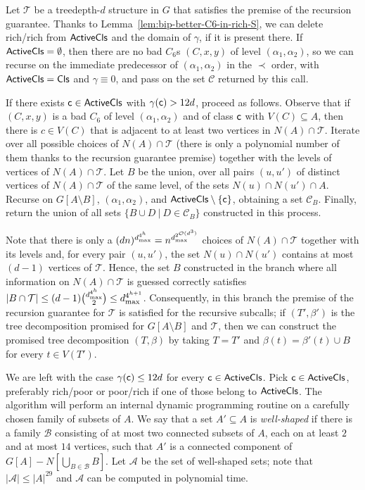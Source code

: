 \documentclass[11pt,a4paper]{article}
\theoremstyle{definition}
\newcommand{\Oh}{\mathcal{O}}
\def\T{\mathcal{T}}
\begin{document}
Let $\T$ be a treedepth-$d$ structure in $G$ that satisfies the premise of the recursion guarantee.
Thanks to Lemma~\ref{lem:bip-better-C6-in-rich-S}, we can delete rich/rich from $\mathsf{ActiveCls}$ and the domain of $\gamma$, if it is present there.
If $\mathsf{ActiveCls} = \emptyset$, then there are no bad $C_6$s $(C,x,y)$ of level $(\alpha_1,\alpha_2)$,
so we can recurse on the immediate predecessor
of $(\alpha_1,\alpha_2)$ in the $\prec$ order, with $\mathsf{ActiveCls} = \mathsf{Cls}$
and $\gamma \equiv 0$, and pass on the set $\mathcal{C}$ returned by this call. 

If there exists $\mathsf{c} \in \mathsf{ActiveCls}$ with $\gamma(\mathsf{c}) > 12d$, proceed
as follows. 
Observe that if $(C,x,y)$ is a bad $C_6$ of level $(\alpha_1,\alpha_2)$ and of class $\mathsf{c}$
with $V(C) \subseteq A$, then there is $c \in V(C)$ that is adjacent to at least two
vertices in $N(A) \cap \T$.
Iterate over all possible choices of $N(A) \cap \T$ (there is only a polynomial number
of them thanks to the recursion guarantee premise) together with the levels of vertices
of $N(A) \cap \T$. Let $B$ be the union, over all pairs $(u,u')$ of distinct vertices
of $N(A) \cap \T$ of the same level, of the sets $N(u) \cap N(u') \cap A$. 
Recurse on $G[A \setminus B]$, $(\alpha_1,\alpha_2)$, and $\mathsf{ActiveCls} \setminus \{\mathsf{c}\}$,
obtaining a set $\mathcal{C}_B$. 
Finally, return the union of all sets $\{B \cup D~|~D \in \mathcal{C}_B\}$ 
constructed in this process.

Note that there is only a $(dn)^{\bigbound^{4^h}} = n^{\bigbound^{2^{\Oh(d^3)}}}$
choices of $N(A) \cap \T$ together with its levels and, for every pair $(u,u')$, 
the set $N(u) \cap N(u')$ contains at most $(d-1)$ vertices of $\T$. 
Hence, the set $B$ constructed in the branch where all information
on $N(A) \cap \T$ is guessed correctly satisfies $|B \cap \T| \leq (d-1) \binom{\bigbound^{4^h}}{2} \leq \bigbound^{4^{h+1}}$.
Consequently, in this branch the premise of the recursion guarantee for $\T$ is satisfied
for the recursive subcalls; if $(T',\beta')$ is the tree decomposition
promised for $G[A \setminus B]$ and $\T$, then 
we can construct the promised tree decomposition $(T,\beta)$ by taking $T = T'$
and $\beta(t) = \beta'(t) \cup B$ for every $t \in V(T')$. 

We are left with the case $\gamma(\mathsf{c}) \leq 12d$ for every $\mathsf{c} \in \mathsf{ActiveCls}$.
Pick $\mathsf{c} \in \mathsf{ActiveCls}$, preferably rich/poor or poor/rich
if one of those belong to $\mathsf{ActiveCls}$.
The algorithm will perform an internal dynamic programming routine on a carefully
chosen family of subsets of $A$. 
We say that a set $A' \subseteq A$ is \emph{well-shaped} if there is a family 
$\mathcal{B}$ consisting of at most two connected subsets of $A$, each on at least $2$
and at most $14$
vertices, such that $A'$ is a connected component of $G[A]-N[\bigcup_{B \in \mathcal{B}} B]$. 
Let $\mathcal{A}$ be the set of well-shaped sets; note that $|\mathcal{A}| \leq |A|^{29}$
and $\mathcal{A}$ can be computed in polynomial time. 
\end{document}
